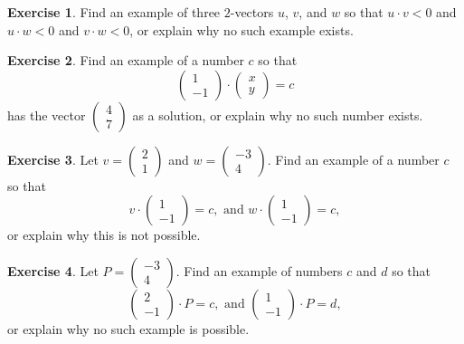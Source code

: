 \documentclass[11pt]{amsart}
\theoremstyle{definition}
\newtheorem{exercise}{Exercise}
\begin{document}
\begin{exercise}
Find an example of three $2$-vectors $u$, $v$, and $w$ so that $u\cdot v < 0$ and $u \cdot w < 0$ and $v \cdot w < 0$, or explain why no such example exists.
\end{exercise}

\begin{exercise}
Find an example of a number $c$ so that
\begin{equation*}
\begin{pmatrix} 1 \\ -1 \end{pmatrix} \cdot \begin{pmatrix} x \\ y \end{pmatrix} = c
\end{equation*}
has the vector $\left( \begin{smallmatrix} 4 \\ 7 \end{smallmatrix} \right)$ as a solution, or explain why no such number exists.
\end{exercise}

\begin{exercise}
Let $v = \left(\begin{smallmatrix} 2 \\ 1 \end{smallmatrix}\right)$ and $w = \left(\begin{smallmatrix} -3 \\ 4 \end{smallmatrix} \right)$. Find an example of a number $c$ so that
\begin{equation*}
v \cdot \begin{pmatrix} 1 \\ -1 \end{pmatrix} = c, \text{ and } w \cdot \begin{pmatrix} 1 \\ -1 \end{pmatrix} = c,
\end{equation*}
or explain why this is not possible.

\end{exercise}

\begin{exercise}
Let $P = \begin{pmatrix}-3 \\ 4 \end{pmatrix}$. Find an example of numbers $c$ and $d$ so that
\begin{equation*}
\begin{pmatrix} 2 \\ -1 \end{pmatrix} \cdot P = c, \text{ and }
\begin{pmatrix} 1 \\ -1 \end{pmatrix} \cdot P = d,
\end{equation*}
or explain why no such example is possible.
\end{exercise}
\end{document}
